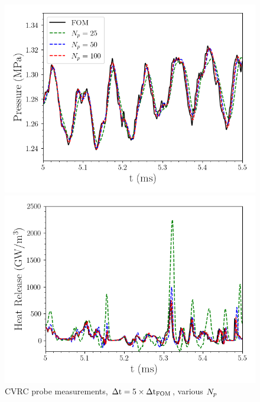 \begin{figure}
	\begin{minipage}{0.49\linewidth}
		\includegraphics[width=0.99\linewidth]{Chapters/CavityAndCVRC/Images/cvrc/unsampled/pressure_probe_unsampled_modes.png}
	\end{minipage}
	\begin{minipage}{0.49\linewidth}
		\includegraphics[width=0.99\linewidth]{Chapters/CavityAndCVRC/Images/cvrc/unsampled/heat_probe_unsampled_modes.png}
	\end{minipage}
	\caption{\label{fig:cvrcUnsampledROMProbes}CVRC probe measurements, $\Delta \text{t} = 5 \times \Delta \text{t}_{\text{FOM}}$, various $N_p$}
\end{figure}

